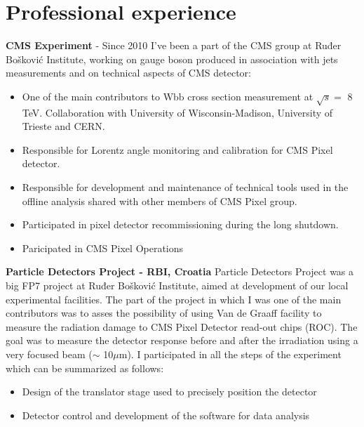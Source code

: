 \documentclass[letterpaper,12pt]{article}
\begin{document}
\section*{Professional experience}

\textbf{CMS Experiment} - Since 2010 I've been a part of the CMS group at Ruđer Bošković Institute, working on gauge boson produced in association with jets measurements and on technical aspects of CMS detector:
\begin{itemize}
\item One of the main contributors to Wbb cross section measurement at $\sqrt{s} =$ 8 TeV. Collaboration with University of Wisconsin-Madison, University of Trieste and CERN.
\item Responsible for Lorentz angle monitoring and calibration for CMS Pixel detector.
\item Responsible for development and maintenance of technical tools used in the offline analysis shared with other members of CMS Pixel group.
\item Participated in pixel detector recommissioning during the long shutdown. 
\item Paricipated in CMS Pixel Operations
\end{itemize}

\textbf{Particle Detectors Project - RBI, Croatia} Particle Detectors Project was a big FP7 project at Ruđer Bošković Institute, aimed at development of our local experimental facilities. The part of the project in which I was one of the main contributors was to asses the possibility of using Van de Graaff facility to measure the radiation damage to CMS Pixel Detector read-out chips (ROC). The goal was to measure the detector response before and after the irradiation using a very focused beam ($\sim$ 10$\mu$m). I participated in all the steps of the experiment which can be summarized as follows:
\begin{itemize}
\item Design of the translator stage used to precisely position the detector
\item Detector control and development of the software for data analysis 
\end{itemize}
\end{document}
